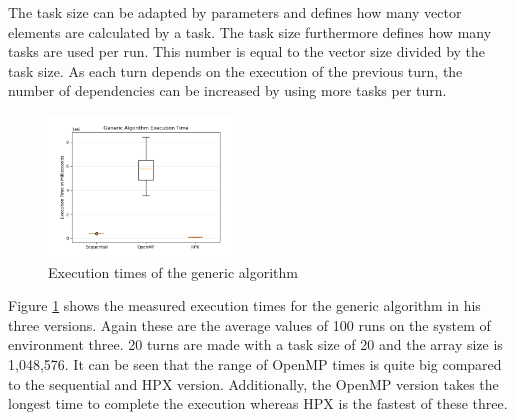   The task size can be adapted by parameters and defines how many vector elements are calculated by a task.
  The task size furthermore defines how many tasks are used per run.
  This number is equal to the vector size divided by the task size.
  As each turn depends on the execution of the previous turn, the number of dependencies can be increased by using more tasks per turn.
\begin{figure}[htbp]
	\centering
	\includegraphics[width=0.45\textwidth]{figures/generic_NoOp.png}
	\caption{Execution times of the generic algorithm}
	\label{fig:gen_NoOp}
\end{figure}

Figure \ref{fig:gen_NoOp} shows the measured execution times for the generic algorithm in his three versions.
Again these are the average values of 100 runs on the system of environment three.
20 turns are made with a task size of 20 and the array size is 1,048,576.
It can be seen that the range of OpenMP times is quite big compared to the sequential and HPX version.
Additionally, the OpenMP version takes the longest time to complete the execution whereas HPX is the fastest of these three. 

